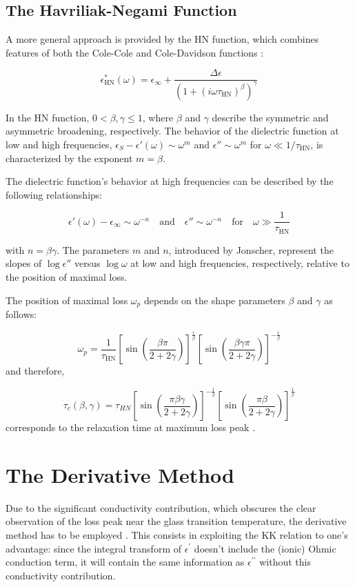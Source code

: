 \subsection{The Havriliak-Negami Function}
A more general approach is provided by the \ac{HN} function, which combines features of both the Cole-Cole and Cole-Davidson functions \cite{kremer2003}:

\[
\epsilon^*_{\text{HN}}(\omega) = \epsilon_\infty + \frac{\Delta \epsilon}{(1 + (i \omega \tau_{\text{HN}})^\beta)^\gamma}
\]

In the HN function, \( 0 < \beta, \gamma \leq 1 \), where \( \beta \) and \( \gamma \) describe the symmetric and asymmetric broadening, respectively. The behavior of the dielectric function at low and high frequencies, \( \epsilon_S - \epsilon'(\omega) \sim \omega^m \) and \( \epsilon'' \sim \omega^m \) for \( \omega \ll 1/\tau_{\text{HN}} \), is characterized by the exponent \( m = \beta \).


The dielectric function's behavior at high frequencies can be described by the following relationships:

\[
\epsilon'(\omega) - \epsilon_\infty \sim \omega^{-n} \quad \text{and} \quad \epsilon'' \sim \omega^{-n} \quad \text{for} \quad \omega \gg \frac{1}{\tau_{\text{HN}}}
\]

with \( n = \beta \gamma \). The parameters \( m \) and \( n \), introduced by Jonscher, represent the slopes of \( \log \epsilon'' \) versus \( \log \omega \) at low and high frequencies, respectively, relative to the position of maximal loss.

The position of maximal loss \( \omega_p \) depends on the shape parameters \( \beta \) and \( \gamma \) as follows:

\[
\omega_p = \frac{1}{\tau_{\text{HN}}} \left[ \sin \left(\frac{\beta \pi}{2 + 2\gamma}\right) \right]^{\frac{1}{\beta}} \left[\sin \left(\frac{\beta \gamma \pi}{2 + 2\gamma}\right)\right]^{-\frac{1}{\beta}}
\]
and therefore,

\[
	\tau_c(\beta, \gamma) = \tau_{HN} \left[\sin\left(\frac{\pi \beta \gamma}{2 + 2\gamma}\right)\right]^{-\frac{1}{\beta}} \left[\sin\left(\frac{\pi \beta}{2 + 2\gamma}\right)\right]^{\frac{1}{\beta}}
\]
corresponds to the relaxation time at maximum loss peak \cite{winkler2021}.
\section{The Derivative Method}

Due to the significant conductivity contribution, which obscures the clear observation of the loss peak near the glass transition temperature, the derivative method has to be employed \cite{wubbenhorst}. %
This consists in exploiting the \ac{KK} relation to one's advantage: since the integral transform of $\epsilon^\prime$ doesn't include the (ionic) Ohmic conduction term, it will contain the same information as $\epsilon^{\prime\prime}$ without this conductivity contribution.

